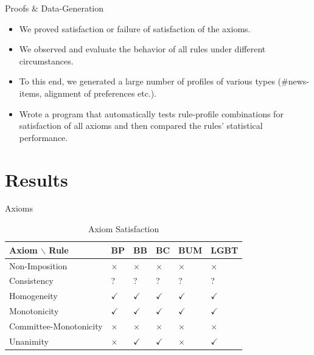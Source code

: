 \documentclass{beamer}
\begin{document}
\begin{frame}{Proofs \& Data-Generation}

\begin{itemize}
\item We proved satisfaction or failure of satisfaction of the axioms.
\item We observed and evaluate the behavior of all rules under different circumstances.
\item To this end, we generated a large number of profiles of various types (\#news-items, alignment of preferences etc.).
\item Wrote a program that automatically tests rule-profile combinations for satisfaction of all axioms and then compared the rules' statistical performance.
\end{itemize}

\end{frame}



\section{Results}

\begin{frame}{Axioms}
	
	\begin{table}[]
		\centering
		\caption{Axiom Satisfaction}
		\label{my-label}
		\begin{tabular}{|l|l|l|l|l|l|}
			\hline
			Axiom $\backslash$ Rule  & BP       & BB       & BC        & BUM       & LGBT \\ \hline
			Non-Imposition         & $\times$ & $\times$ & $\times$  & $\times$  & $\times$  \\ \hline
			Consistency            & ?        & ?        & ?         & ?         & ?         \\ \hline
			Homogeneity        & $\checkmark$ & $\checkmark$  & $\checkmark$   & $\checkmark$ & $\checkmark$ \\ \hline
			Monotonicity     & $\checkmark$  & $\checkmark$  & $\checkmark$ & $\checkmark$   & $\checkmark$ \\ \hline
			Committee-Monotonicity & $\times$  & $\times$      & $\times$     & $\times$      & $\times$  \\ \hline
			Unanimity              & $\times$  & $\checkmark$  & $\checkmark$ & $\times$      & $\checkmark$ \\ \hline
		\end{tabular}
	\end{table}
\end{frame}
\end{document}
